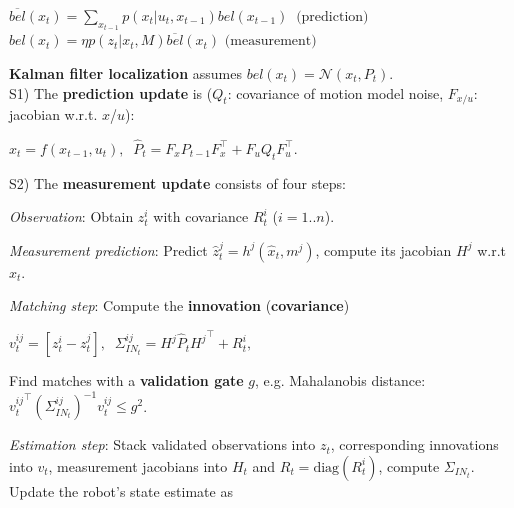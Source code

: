 \documentclass[landscape]{article}
\newcommand{\vmspace}{\vspace{-7pt}}
\newcommand{\vamspace}{\vspace{-3pt}}
\newcommand{\vpspace}{\vspace{5pt}}
\begin{document}
\begin{multicols}{3}
\begin{minipage}{\columnwidth}
  \vamspace

  \begin{algorithm}[H]
    \DontPrintSemicolon
    {
    $
    \overline{bel}(x_t)
    =
    \sum_{x_{t-1}} p(x_t|u_t, x_{t-1}) bel(x_{t-1})
    \;\;
    \text{(prediction)}
    $\;
    $
    bel(x_t)
    =
    \eta p(z_t|x_t, M) \overline{bel}(x_t)
    $
    \hspace{29pt}
    $
    \text{(measurement)}
    $\;
    }
  \end{algorithm}
\end{minipage}

\vpspace


\begin{minipage}{\columnwidth}
  \textbf{Kalman filter localization} assumes
  $bel(x_t) = \mathcal N (x_t, P_t).  $\\
  S1) The \textbf{prediction update} is ($Q_t$: covariance of motion model
  noise, $F_{x/u}$: jacobian w.r.t. $x$/$u$):
  \vmspace
  \begin{center}
    $
    \hat x_t = f(x_{t-1}, u_t),\;\;
    \hat P_t = F_x P_{t-1} F_x^\intercal + F_u Q_t F_u^\intercal.
    $
  \end{center}
  \vmspace
  S2) The \textbf{measurement update} consists of four steps:
  \begin{compactenum}
  \item \textit{Observation}: Obtain $z_t^i$ with
    covariance $R_t^i$ ($i=1..n$).
  \item \textit{Measurement prediction}: Predict $\hat z_t^j = h^j(\hat x_t, m^j)$,
    compute its jacobian $H^j$ w.r.t $\hat x_t$.
  \item \textit{Matching step}: Compute the \textbf{innovation}
    (\textbf{covariance})

    \begin{center}
      $
      v_t^{ij}=[z_t^i - z_t^j],\;\;
      \Sigma_{IN_t}^{ij} = H^j \hat P_t {H^j}^\intercal + R_t^i,
      $
    \end{center}

    Find matches with a \textbf{validation gate} $g$, e.g. Mahalanobis distance:
    ${v_t^{ij}}^\intercal (\Sigma_{IN_t}^{ij})^{-1} v_t^{ij} \le g^2$.

  \item \textit{Estimation step}: Stack validated observations into $z_t$, corresponding
    innovations into $v_t$, measurement jacobians into $H_t$ and
    $R_t = \mathrm{diag}(R_t^i)$, compute $\Sigma_{IN_t}$. Update the robot's
    state estimate as


\end{compactenum}
\end{minipage}
\end{multicols}
\end{document}
